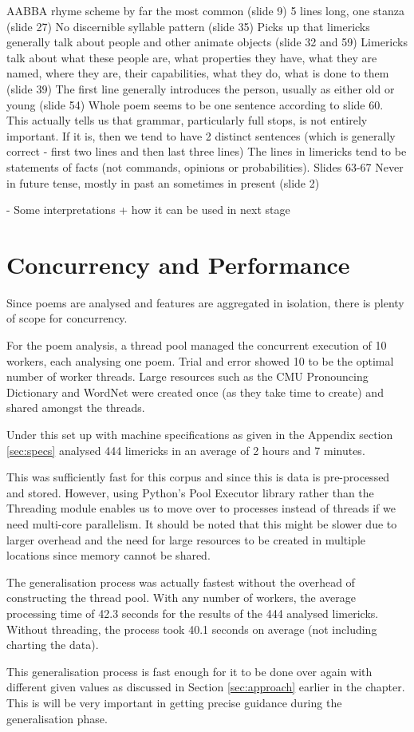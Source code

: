 AABBA rhyme scheme by far the most common (slide 9)
5 lines long, one stanza (slide 27)
No discernible syllable pattern (slide 35)
Picks up that limericks generally talk about people and other animate objects (slide 32 and 59)
Limericks talk about what these people are, what properties they have, what they are named, where they are, their capabilities, what they do, what is done to them (slide 39)
The first line generally introduces the person, usually as either old or young (slide 54)
Whole poem seems to be one sentence according to slide 60. This actually tells us that grammar, particularly full stops, is not entirely important. If it is, then we tend to have 2 distinct sentences (which is generally correct - first two lines and then last three lines)
The lines in limericks tend to be statements of facts (not commands, opinions or probabilities). Slides 63-67
Never in future tense, mostly in past an sometimes in present (slide 2)

- Some interpretations + how it can be used in next stage

\section{Concurrency and Performance}
\label{sec:interpret-perf}

Since poems are analysed and features are aggregated in isolation, there is plenty of scope for concurrency.

For the poem analysis, a thread pool managed the concurrent execution of 10 workers, each analysing one poem. Trial and error showed 10 to be the optimal number of worker threads. Large resources such as the CMU Pronouncing Dictionary and WordNet were created once (as they take time to create) and shared amongst the threads.

Under this set up with machine specifications as given in the Appendix section \ref{sec:specs} analysed 444 limericks in an average of 2 hours and 7 minutes.

This was sufficiently fast for this corpus and since this is data is pre-processed and stored. However, using Python's Pool Executor library rather than the Threading module enables us to move over to processes instead of threads if we need multi-core parallelism. It should be noted that this might be slower due to larger overhead and the need for large resources to be created in multiple locations since memory cannot be shared.

The generalisation process was actually fastest without the overhead of constructing the thread pool. With any number of workers, the average processing time of 42.3 seconds for the results of the 444 analysed limericks. Without threading, the process took 40.1 seconds on average (not including charting the data).

This generalisation process is fast enough for it to be done over again with different given values as discussed in Section \ref{sec:approach} earlier in the chapter. This is will be very important in getting precise guidance during the generalisation phase. 



